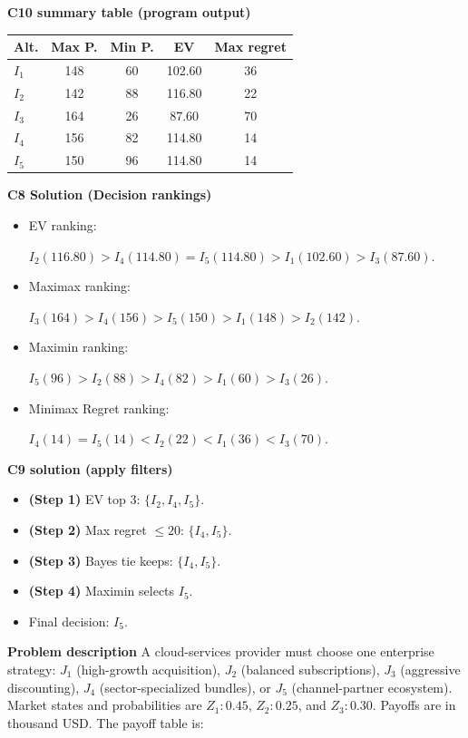 \begin{ExamProblems}
		\textbf{C10 summary table (program output)}\par
		\begin{center}
			\begin{tabular}{l c c c c}
				\hline
				Alt. & Max P. & Min P. & EV & Max regret \\
				\hline
				$I_1$ & 148 & 60 & 102.60 & 36 \\
				$I_2$ & 142 & 88 & 116.80 & 22 \\
				$I_3$ & 164 & 26 & 87.60 & 70 \\
				$I_4$ & 156 & 82 & 114.80 & 14 \\
				$I_5$ & 150 & 96 & 114.80 & 14 \\
				\hline
			\end{tabular}
		\end{center}
		
		\textbf{C8 Solution (Decision rankings)}\par
		\begin{itemize}
			\item EV ranking: \par $I_2(116.80)>I_4(114.80)=I_5(114.80)>I_1(102.60)>I_3(87.60)$.
			\item Maximax ranking:\par $I_3(164)>I_4(156)>I_5(150)>I_1(148)>I_2(142)$.
			\item Maximin ranking: \par $I_5(96)>I_2(88)>I_4(82)>I_1(60)>I_3(26)$.
			\item Minimax Regret ranking:\par $I_4(14)=I_5(14)<I_2(22)<I_1(36)<I_3(70)$.
		\end{itemize}
		
		\textbf{C9 solution (apply filters)}\par
		\begin{itemize}
			\item \textbf{(Step 1)} EV top 3: $\{I_2,I_4,I_5\}$.
			\item \textbf{(Step 2)} Max regret $\leq 20$: $\{I_4,I_5\}$.
			\item \textbf{(Step 3)} Bayes tie keeps: $\{I_4,I_5\}$.
			\item \textbf{(Step 4)} Maximin selects $I_5$.
			\item Final decision: $I_5$.
		\end{itemize}
		
		\newpage
		\item
		\textbf{Problem description}
		A cloud-services provider must choose one enterprise strategy: $J_1$ (high-growth acquisition), $J_2$ (balanced subscriptions), $J_3$ (aggressive discounting), $J_4$ (sector-specialized bundles), or $J_5$ (channel-partner ecosystem).
		Market states and probabilities are $Z_1:0.45$, $Z_2:0.25$, and $Z_3:0.30$. Payoffs are in thousand USD. The payoff table is:
		

\end{ExamProblems}
